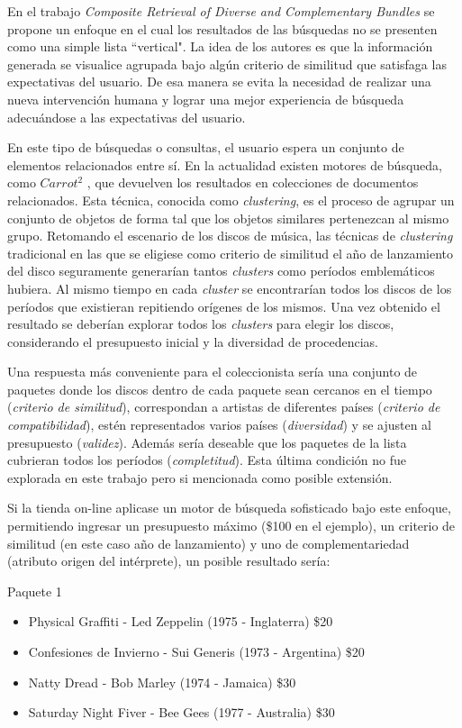 En el trabajo {\em Composite Retrieval of Diverse and Complementary Bundles} \cite{journals/tkde/Amer-YahiaBCFMZ14} se propone un enfoque en el cual los resultados de las búsquedas no se presenten como una simple lista ``vertical". La idea de los autores es que la información generada se visualice agrupada bajo algún criterio de similitud que satisfaga las expectativas del usuario. De esa manera se evita la necesidad de realizar una nueva intervención humana y lograr una mejor experiencia de búsqueda adecuándose a las expectativas del usuario.

En este tipo de búsquedas o consultas, el usuario espera un conjunto de elementos relacionados entre sí. En la actualidad existen motores de búsqueda, como $Carrot^{2}$ \cite{url:carrot}, que devuelven los resultados en colecciones de documentos relacionados. Esta técnica, conocida como {\em clustering}, es el proceso de agrupar un conjunto de objetos de forma tal que los objetos similares pertenezcan al mismo grupo. Retomando el escenario de los discos de música, las técnicas de {\em clustering} tradicional en las que se eligiese como criterio de similitud el año de lanzamiento del disco seguramente generarían tantos {\em clusters} como períodos emblemáticos hubiera. Al mismo tiempo en cada {\em cluster} se encontrarían todos los discos de los períodos que existieran repitiendo orígenes de los mismos. Una vez obtenido el resultado se deberían explorar todos los {\em clusters} para elegir los discos, considerando el presupuesto inicial y la diversidad de procedencias.

Una respuesta más conveniente para el coleccionista sería una conjunto de paquetes donde los discos dentro de cada paquete sean cercanos en el tiempo ({\em criterio de similitud}), correspondan a artistas de diferentes países ({\em criterio de compatibilidad}), estén representados varios países ({\em diversidad}) y se ajusten al presupuesto ({\em validez}). Además sería deseable que los paquetes de la lista cubrieran todos los períodos ({\em completitud}). Esta última condición no fue explorada en este trabajo pero si mencionada como posible extensión.

Si la tienda on-line aplicase un motor de búsqueda sofisticado bajo este enfoque, permitiendo ingresar un presupuesto máximo (\$100 en el ejemplo), un criterio de similitud (en este caso año de lanzamiento) y uno de complementariedad (atributo origen del intérprete), un posible resultado sería:

\begin{mybox}{Paquete 1}
	\begin{itemize}
		\item {\scriptsize Physical Graffiti - Led Zeppelin (1975 - Inglaterra) \$20}
		\item {\scriptsize Confesiones de Invierno - Sui Generis (1973 - Argentina) \$20}
		\item {\scriptsize Natty Dread - Bob Marley (1974 - Jamaica) \$30}
		\item {\scriptsize Saturday Night Fiver - Bee Gees (1977 - Australia) \$30}
	\end{itemize}
\end{mybox}

